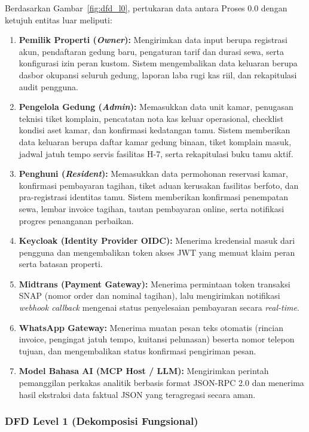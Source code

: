 Berdasarkan Gambar~\ref{fig:dfd_l0}, pertukaran data antara Proses 0.0 dengan ketujuh entitas luar meliputi:
\begin{enumerate}[label=\arabic*., leftmargin=*]
  \item \textbf{Pemilik Properti (\textit{Owner}):} Mengirimkan data input berupa registrasi akun, pendaftaran gedung baru, pengaturan tarif dan durasi sewa, serta konfigurasi izin peran kustom. Sistem mengembalikan data keluaran berupa dasbor okupansi seluruh gedung, laporan laba rugi kas riil, dan rekapitulasi audit pengguna.
  \item \textbf{Pengelola Gedung (\textit{Admin}):} Memasukkan data unit kamar, penugasan teknisi tiket komplain, pencatatan nota kas keluar operasional, checklist kondisi aset kamar, dan konfirmasi kedatangan tamu. Sistem memberikan data keluaran berupa daftar kamar gedung binaan, tiket komplain masuk, jadwal jatuh tempo servis fasilitas H-7, serta rekapitulasi buku tamu aktif.
  \item \textbf{Penghuni (\textit{Resident}):} Memasukkan data permohonan reservasi kamar, konfirmasi pembayaran tagihan, tiket aduan kerusakan fasilitas berfoto, dan pra-registrasi identitas tamu. Sistem memberikan konfirmasi penempatan sewa, lembar invoice tagihan, tautan pembayaran online, serta notifikasi progres penanganan perbaikan.
  \item \textbf{Keycloak (Identity Provider OIDC):} Menerima kredensial masuk dari pengguna dan mengembalikan token akses JWT yang memuat klaim peran serta batasan properti.
  \item \textbf{Midtrans (Payment Gateway):} Menerima permintaan token transaksi SNAP (nomor order dan nominal tagihan), lalu mengirimkan notifikasi \textit{webhook callback} mengenai status penyelesaian pembayaran secara \textit{real-time}.
  \item \textbf{WhatsApp Gateway:} Menerima muatan pesan teks otomatis (rincian invoice, pengingat jatuh tempo, kuitansi pelunasan) beserta nomor telepon tujuan, dan mengembalikan status konfirmasi pengiriman pesan.
  \item \textbf{Model Bahasa AI (MCP Host / LLM):} Mengirimkan perintah pemanggilan perkakas analitik berbasis format JSON-RPC 2.0 dan menerima hasil ekstraksi data faktual JSON yang teragregasi secara aman.
\end{enumerate}

\subsubsection{DFD Level 1 (Dekomposisi Fungsional)}

